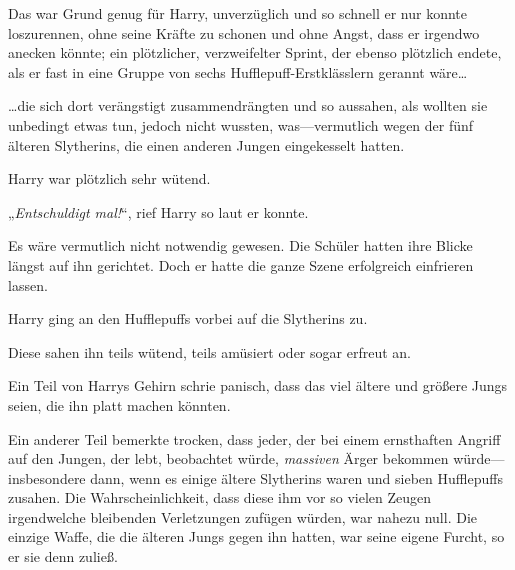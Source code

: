 Das war Grund genug für Harry, unverzüglich und so schnell er nur konnte loszurennen, ohne seine Kräfte zu schonen und ohne Angst, dass er irgendwo anecken könnte; ein plötzlicher, verzweifelter Sprint, der ebenso plötzlich endete, als er fast in eine Gruppe von sechs Hufflepuff-Erstklässlern gerannt wäre…

…die sich dort verängstigt zusammendrängten und so aussahen, als wollten sie unbedingt etwas tun, jedoch nicht wussten, was—vermutlich wegen der fünf älteren Slytherins, die einen anderen Jungen eingekesselt hatten.

Harry war plötzlich sehr wütend.

„\emph{Entschuldigt mal!}“, rief Harry so laut er konnte.

Es wäre vermutlich nicht notwendig gewesen. Die Schüler hatten ihre Blicke längst auf ihn gerichtet. Doch er hatte die ganze Szene erfolgreich einfrieren lassen.

Harry ging an den Hufflepuffs vorbei auf die Slytherins zu.

Diese sahen ihn teils wütend, teils amüsiert oder sogar erfreut an.

Ein Teil von Harrys Gehirn schrie panisch, dass das viel ältere und größere Jungs seien, die ihn platt machen könnten.

Ein anderer Teil bemerkte trocken, dass jeder, der bei einem ernsthaften Angriff auf den Jungen, der lebt, beobachtet würde, \emph{massiven} Ärger bekommen würde—insbesondere dann, wenn es einige ältere Slytherins waren und sieben Hufflepuffs zusahen. Die Wahrscheinlichkeit, dass diese ihm vor so vielen Zeugen irgendwelche bleibenden Verletzungen zufügen würden, war nahezu null. Die einzige Waffe, die die älteren Jungs gegen ihn hatten, war seine eigene Furcht, so er sie denn zuließ.

